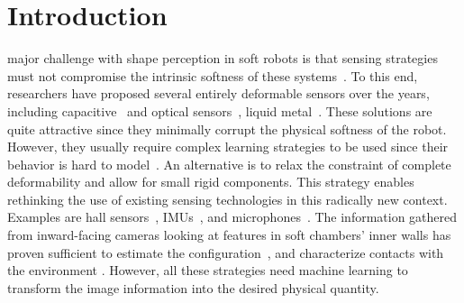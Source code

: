 \section{Introduction}\label{sec:srslam:introduction}
%
 major challenge with shape perception in soft robots is that sensing strategies must not compromise the intrinsic softness of these systems~\citep{polygerinos2017soft,wang2018toward}. %
%
To this end, researchers have proposed several entirely deformable sensors over the years, including capacitive~\citep{scimeca2019model} and optical sensors~\citep{li2021scaling}, liquid metal~\citep{wall2017method}. These solutions are quite attractive since they minimally corrupt the physical softness of the robot. However, they usually require complex learning strategies to be used since their behavior is hard to model~\citep{thuruthel2019soft,truby2020distributed}.
%
% 
An alternative is to relax the constraint of complete deformability and allow for small rigid components. This strategy enables rethinking the use of existing sensing technologies in this radically new context. Examples are hall sensors~\citep{guo2019continuum}, IMUs~\citep{hughes2020sensing}, and microphones~\citep{zoller2018acoustic}.
%
The information gathered from inward-facing cameras looking at features in soft chambers' inner walls has proven sufficient to estimate the configuration~\citep{she2020exoskeleton,werner2020vision}, and characterize contacts with the environment \citep{ward2018tactip,lin2020curvature}. However, all these strategies need machine learning to transform the image information into the desired physical quantity.
%
